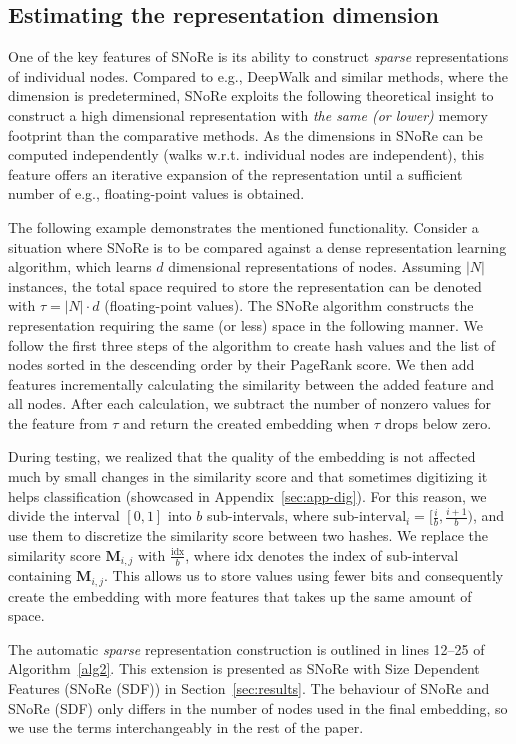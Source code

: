 \documentclass[twoside,11pt]{article}
\begin{document}
\subsection{Estimating the representation dimension}
\label{sec:dim}
One of the key features of SNoRe is its ability to construct \emph{sparse} representations of individual nodes. Compared to e.g., DeepWalk and similar methods, where the dimension is predetermined, SNoRe exploits the following theoretical insight to construct a high dimensional representation with \emph{the same (or lower)} memory footprint than the comparative methods.
As the dimensions in SNoRe can be computed independently (walks w.r.t. individual nodes are independent), this feature offers an iterative expansion of the representation until a sufficient number of e.g., floating-point values is obtained.

The following example demonstrates the mentioned functionality. Consider a situation where SNoRe is to be compared against a dense representation learning algorithm, which learns $d$ dimensional representations of nodes. Assuming $|N|$ instances, the total space required to store the representation can be denoted with $\tau = |N| \cdot d$ (floating-point values). The SNoRe algorithm constructs the representation requiring the same (or less) space in the following manner.
We follow the first three steps of the algorithm to create hash values and the list of nodes sorted in the descending order by their PageRank score. We then add features incrementally calculating the similarity between the added feature and all nodes. After each calculation, we subtract the number of nonzero values for the feature from $\tau$ and return the created embedding when $\tau$ drops below zero.

During testing, we realized that the quality of the embedding is not affected much by small changes in the similarity score and that sometimes digitizing it helps classification (showcased in  Appendix~\ref{sec:app-dig}). For this reason, we divide the interval $[0, 1]$ into $b$ sub-intervals, where $\text{sub-interval}_i = [\frac{i}{b}, \frac{i+1}{b})$, and use them to discretize the similarity score between two hashes. We replace the similarity score $\boldsymbol{M}_{i,j}$ with $\frac{\textrm{idx}}{b}$, where $\textrm{idx}$ denotes the index of sub-interval containing $\boldsymbol{M}_{i,j}$. This allows us to store values using fewer bits and consequently create the embedding with more features that takes up the same amount of space.

The automatic \emph{sparse} representation construction is outlined in lines 12--25 of Algorithm~\ref{alg2}. This extension is presented as SNoRe with Size Dependent Features (SNoRe (SDF)) in Section~\ref{sec:results}. The behaviour of SNoRe and SNoRe (SDF) only differs in the number of nodes used in the final embedding, so we use the terms interchangeably in the rest of the paper. 
\end{document}
